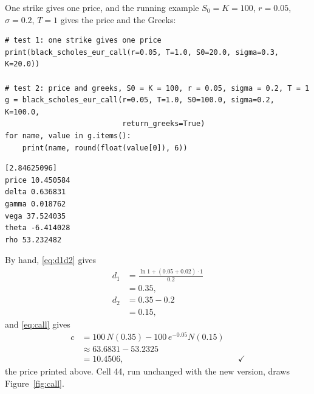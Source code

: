 \documentclass[11pt,a4paper]{article}
\newcommand{\subhead}[1]{\par\medskip\noindent{\large\bfseries #1}\par\smallskip\noindent\ignorespaces}
\begin{document}
\subhead{Test.} One strike gives one price, and the running example $S_0=K=100$, $r=0.05$, $\sigma=0.2$, $T=1$ gives the price and the Greeks:
\par\smallskip\noindent\begin{minipage}{\linewidth}\begin{lstlisting}[style=py,title={test of the new version}]
# test 1: one strike gives one price
print(black_scholes_eur_call(r=0.05, T=1.0, S0=20.0, sigma=0.3, K=20.0))

# test 2: price and greeks, S0 = K = 100, r = 0.05, sigma = 0.2, T = 1
g = black_scholes_eur_call(r=0.05, T=1.0, S0=100.0, sigma=0.2, K=100.0,
                           return_greeks=True)
for name, value in g.items():
    print(name, round(float(value[0]), 6))
\end{lstlisting}
\begin{lstlisting}[style=out,title={output}]
[2.84625096]
price 10.450584
delta 0.636831
gamma 0.018762
vega 37.524035
theta -6.414028
rho 53.232482
\end{lstlisting}\end{minipage}\par\smallskip
By hand, \eqref{eq:d1d2} gives
\begin{align*}
d_1 &= \frac{\ln 1+(0.05+0.02)\cdot 1}{0.2}\\
&= 0.35,\\
d_2 &= 0.35-0.2\\
&= 0.15,
\end{align*}
and \eqref{eq:call} gives
\begin{align*}
c &= 100\,N(0.35)-100\,e^{-0.05}N(0.15)\\
&\approx 63.6831-53.2325\\
&= 10.4506, && \checkmark
\end{align*}
the price printed above. Cell 44, run unchanged with the new version, draws Figure~\ref{fig:call}.
\end{document}
